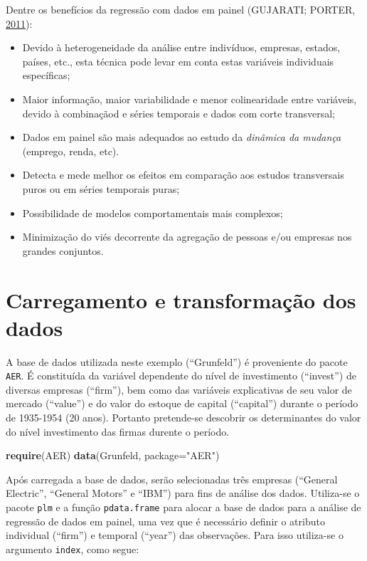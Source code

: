 \documentclass[12pt,brazil,oneside]{book}
\newenvironment{Shaded}{\begin{snugshade}}{\end{snugshade}}
\newcommand{\DataTypeTok}[1]{\textcolor[rgb]{0.13,0.29,0.53}{#1}}
\newcommand{\KeywordTok}[1]{\textcolor[rgb]{0.13,0.29,0.53}{\textbf{#1}}}
\newcommand{\NormalTok}[1]{#1}
\newcommand{\StringTok}[1]{\textcolor[rgb]{0.31,0.60,0.02}{#1}}
\begin{document}
Dentre os benefícios da regressão com dados em painel (GUJARATI; PORTER,
\protect\hyperlink{ref-Gujarati2011}{2011}):

\begin{itemize}
\item
  Devido à heterogeneidade da análise entre indivíduos, empresas,
  estados, países, etc., esta técnica pode levar em conta estas
  variáveis individuais específicas;
\item
  Maior informação, maior variabilidade e menor colinearidade entre
  variáveis, devido à combinaçãod e séries temporais e dados com corte
  transversal;
\item
  Dados em painel são mais adequados ao estudo da \emph{dinâmica da
  mudança} (emprego, renda, etc).
\item
  Detecta e mede melhor os efeitos em comparação aos estudos
  transversais puros ou em séries temporais puras;
\item
  Possibilidade de modelos comportamentais mais complexos;
\item
  Minimização do viés decorrente da agregação de pessoas e/ou empresas
  nos grandes conjuntos.
\end{itemize}

\hypertarget{carregamento-e-transformacao-dos-dados}{%
\section{Carregamento e transformação dos
dados}\label{carregamento-e-transformacao-dos-dados}}

A base de dados utilizada neste exemplo (``Grunfeld'') é proveniente do
pacote \texttt{AER}. É constituída da variável dependente do nível de
investimento (``invest'') de diversas empresas (``firm''), bem como das
variáveis explicativas de seu valor de mercado (``value'') e do valor do
estoque de capital (``capital'') durante o período de 1935-1954 (20
anos). Portanto pretende-se descobrir os determinantes do valor do nível
investimento das firmas durente o período.

\begin{Shaded}
\begin{Highlighting}[]
\KeywordTok{require}\NormalTok{(AER) }
\KeywordTok{data}\NormalTok{(Grunfeld, }\DataTypeTok{package=}\StringTok{"AER"}\NormalTok{)}
\end{Highlighting}
\end{Shaded}

Após carregada a base de dados, serão selecionadas três empresas
(``General Electric'', ``General Motors'' e ``IBM'') para fins de
análise dos dados. Utiliza-se o pacote \texttt{plm} e a função
\texttt{pdata.frame} para alocar a base de dados para a análise de
regressão de dados em painel, uma vez que é necessário definir o
atributo individual (``firm'') e temporal (``year'') das observações.
Para isso utiliza-se o argumento \texttt{index}, como segue:
\end{document}
